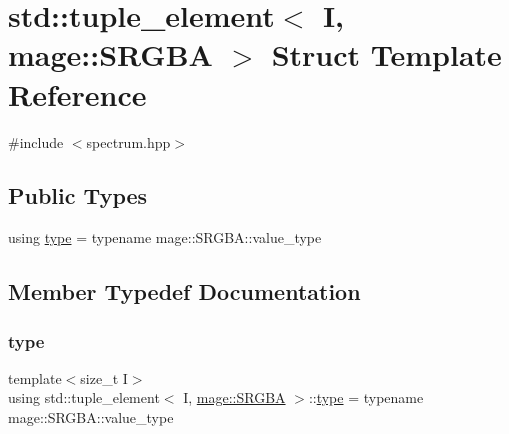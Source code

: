 \hypertarget{structstd_1_1tuple__element_3_01_i_00_01mage_1_1_s_r_g_b_a_01_4}{}\section{std\+:\+:tuple\+\_\+element$<$ I, mage\+:\+:S\+R\+G\+BA $>$ Struct Template Reference}
\label{structstd_1_1tuple__element_3_01_i_00_01mage_1_1_s_r_g_b_a_01_4}


{\ttfamily \#include $<$spectrum.\+hpp$>$}

\subsection*{Public Types}
\begin{DoxyCompactItemize}
\item 
using \mbox{\hyperlink{structstd_1_1tuple__element_3_01_i_00_01mage_1_1_s_r_g_b_a_01_4_a96b1a30440a23f511ffb8996813f821e}{type}} = typename mage\+::\+S\+R\+G\+B\+A\+::value\+\_\+type
\end{DoxyCompactItemize}


\subsection{Member Typedef Documentation}
\mbox{\label{structstd_1_1tuple__element_3_01_i_00_01mage_1_1_s_r_g_b_a_01_4_a96b1a30440a23f511ffb8996813f821e}} 
\subsubsection{\texorpdfstring{type}{type}}
{\footnotesize\ttfamily template$<$size\+\_\+t I$>$ \\
using std\+::tuple\+\_\+element$<$ I, \mbox{\hyperlink{structmage_1_1_s_r_g_b_a}{mage\+::\+S\+R\+G\+BA}} $>$\+::\mbox{\hyperlink{structstd_1_1tuple__element_3_01_i_00_01mage_1_1_s_r_g_b_a_01_4_a96b1a30440a23f511ffb8996813f821e}{type}} =  typename mage\+::\+S\+R\+G\+B\+A\+::value\+\_\+type}

